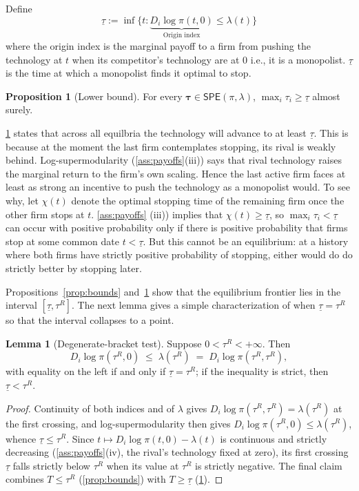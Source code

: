 \documentclass[12pt,reqno]{article}
\newcommand{\SPE}{\ensuremath{\mathsf{SPE}}}
\theoremstyle{definition} \newtheorem{example}{Example}
\theoremstyle{definition} \newtheorem{condition}{Condition}
\theoremstyle{definition} \newtheorem{corollary}{Corollary}
\theoremstyle{definition} \newtheorem{claim}{Claim}
\theoremstyle{definition} \newtheorem{definition}{Definition}
\theoremstyle{definition} \newtheorem{conjecture}{Conjecture}
\theoremstyle{definition} \newtheorem{Lemma}{Lemma}
\theoremstyle{definition} \newtheorem{lemma}{Lemma}
\theoremstyle{plain} \newtheorem{theorem}{Theorem}
\theoremstyle{definition} \newtheorem{assumption}{Assumption}
\theoremstyle{definition} \newtheorem*{assumptionnonumber}{Assumption}
\theoremstyle{definition} \newtheorem*{theoremNoNumber}{Proposition}
\theoremstyle{definition}
\theoremstyle{definition}\newtheorem{proposition}{Proposition}
\theoremstyle{definition} \newtheorem{result}{Result}
\theoremstyle{definition} \newtheorem*{definitionNoNumber}{Definition}
\theoremstyle{definition} \newtheorem{Definition}{Definition}
\theoremstyle{definition} \newtheorem*{DefinitionNoNumber}{Definition}
\theoremstyle{definition} \newtheorem*{fact}{Fact}
\theoremstyle{definition} \newtheorem*{property}{Property}
\theoremstyle{definition} \newtheorem{remark}{Remark}
\begin{document}
Define 
\[
\underline \tau := \inf \Big\{ t: \underbrace{D_i\log\pi(t,0)}_{\text{Origin index}} \leq \lambda(t) \Big\}
\]
where the origin index is the marginal payoff to a firm from pushing the technology at $t$ when its competitor's technology are at $0$ i.e., it is a monopolist. $\underline \tau$ is the time at which a monopolist finds it optimal to stop. 


\begin{proposition}[Lower bound]\label{prop:frontier}
For every $\bm\tau\in\SPE(\pi,\lambda)$, $\max_i \tau_i \ge\underline\tau$ almost surely. 
\end{proposition}

\cref{prop:frontier} states that across all equilbria the technology will advance to at least $\underline \tau$. This is because at the moment the last firm contemplates stopping, its rival is weakly behind. Log-supermodularity (\cref{ass:payoffs}(iii)) says that rival technology raises the marginal return to the firm's own scaling. Hence the last active firm faces at least as strong an incentive to push the technology as a monopolist would. To see why, let $\chi(t)$ denote the optimal stopping time of the remaining firm once the other firm stops at $t$.  \cref{ass:payoffs} (iii)) implies that $\chi(t)\ge\underline\tau$, so $\max_{i}\tau_{i}< \underline\tau$ can occur with positive probability only if there is positive probability that firms stop at some common date $t < \underline \tau$. But this cannot be an equilibrium: at a history where both firms have strictly positive probability of stopping, either would do  do strictly better by stopping later.


Propositions~\ref{prop:bounds} and~\ref{prop:frontier} show that the equilibrium frontier lies in the interval $[\underline{\tau},\tau^R]$. The next lemma gives a simple characterization of when $\underline{\tau}=\tau^R$ so that the interval collapses to  a point.  
\begin{lemma}[Degenerate-bracket test]\label{lem:bracket-test}
Suppose $0 < \tau^R < +\infty$. Then
\[
D_i\log\pi(\tau^R,0) \;\le\; \lambda(\tau^R) \;=\; D_i\log\pi(\tau^R,\tau^R),
\]
with equality on the left if and only if $\underline\tau = \tau^R$; if the inequality is strict, then $\underline\tau < \tau^R$.
\end{lemma}

\begin{proof}
Continuity of both indices and of $\lambda$ gives $D_i\log\pi(\tau^R,\tau^R)=\lambda(\tau^R)$ at the first crossing, and log-supermodularity then gives $D_i\log\pi(\tau^R,0)\le\lambda(\tau^R)$, whence $\underline\tau\le\tau^R$. Since $t\mapsto D_i\log\pi(t,0)-\lambda(t)$ is continuous and strictly decreasing (\cref{ass:payoffs}(iv), the rival's technology fixed at zero), its first crossing $\underline\tau$ falls strictly below $\tau^R$ when its value at $\tau^R$ is strictly negative. The final claim combines $T\le\tau^R$ (\cref{prop:bounds}) with $T\ge\underline\tau$ (\cref{prop:frontier}).
\end{proof}
\end{document}
